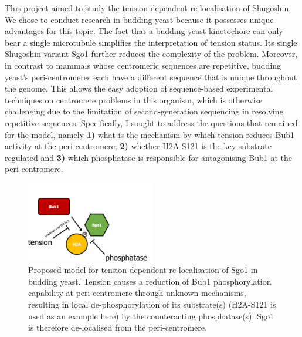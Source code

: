 This project aimed to study the tension-dependent re-localisation of Shugoshin. We chose to conduct research in budding yeast because it possesses unique advantages for this topic. The fact that a budding yeast kinetochore can only bear a single microtubule simplifies the interpretation of tension status. Its single Shugoshin variant Sgo1 further reduces the complexity of the problem. Moreover, in contrast to mammals whose centromeric sequences are repetitive, budding yeast's peri-centromeres each have a different sequence that is unique throughout the genome. This allows the easy adoption of sequence-based experimental techniques on centromere problems in this organism, which is otherwise challenging due to the limitation of second-generation sequencing in resolving repetitive sequences. Specifically, I sought to address the questions that remained for the \cite{Nerusheva2014} model, namely \textbf{1)} what is the mechanism by which tension reduces Bub1 activity at the peri-centromere; \textbf{2)} whether H2A-S121 is the key substrate regulated and \textbf{3)} which phosphatase is responsible for antagonising Bub1 at the peri-centromere. 

\begin{figure}[htbp]
  \centering
  \includegraphics[width=0.5\textwidth]{figures/naive model.pdf}
  \caption[Proposed model for tension-dependent re-localisation of Sgo1 in  budding yeast]{Proposed model for tension-dependent re-localisation of Sgo1 in  budding yeast. Tension causes a reduction of Bub1 phosphorylation capability at peri-centromere through unknown mechanisms, resulting in local de-phosphorylation of its substrate(s) (H2A-S121 is used as an example here) by the counteracting phosphatase(s). Sgo1 is therefore de-localised from the peri-centromere.}
  \label{fig:naive}
\end{figure} 



